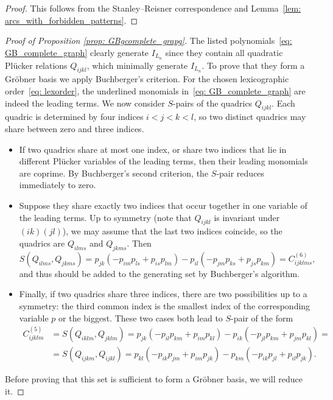 \documentclass[12pt,a4paper]{amsart}
\theoremstyle{definition}
\begin{document}
\begin{proof}
This follows from the Stanley–Reisner correspondence and Lemma~\ref{lem: arcs_with_forbidden_patterns}.
\end{proof}
\begin{proof}[Proof of Proposition \ref{prop: GBgcomplete_grapg}]
The listed polynomials~\eqref{eq: GB_complete_graph} clearly generate $I_{L_n}$ since they contain all quadratic Plücker relations $Q_{ijkl}$, which minimally generate $I_{L_n}$. To prove that they form a Gröbner basis we apply Buchberger’s criterion. 
For the chosen lexicographic order~\eqref{eq: lexorder}, the underlined monomials in~\eqref{eq: GB_complete_graph} are indeed the leading terms. We now consider $S$-pairs of the quadrics $Q_{ijkl}$. Each quadric is determined by four indices $i<j<k<l$, so two distinct quadrics may share between zero and three indices.
\begin{itemize}
    \item If two quadrics share at most one index, or share two indices that lie in different Plücker variables of the leading terms, then their leading monomials are coprime. By Buchberger’s second criterion, the $S$-pair reduces immediately to zero.
    \item Suppose they share exactly two indices that occur together in one variable of the leading terms. Up to symmetry (note that $Q_{ijkl}$ is invariant under $(ik)(jl)$), we may assume that the last two indices coincide, so the quadrics are $Q_{ilms}$ and $Q_{jkms}$. Then
\[
S(Q_{ilms}, Q_{jkms}) 
= p_{jk}(-p_{im}p_{ls} + p_{is}p_{lm}) - p_{il}(-p_{jm}p_{ks} + p_{js}p_{km})
= C^{(6)}_{ijklms},
\]
and thus should be added to the generating set by Buchberger's algorithm.
\item Finally, if two quadrics share three indices, there are two possibilities up to a symmetry: the third common index is the smallest index of the corresponding variable $p$ or the biggest. These two cases both lead to $S$-pair of the form
 \begin{align*}
     C^{(5)}_{ijklm} & =  S(Q_{iklm}, Q_{jklm}) = p_{jk}(-p_{il}p_{km} + p_{im}p_{kl}) - p_{ik}(-p_{jl}p_{km} + p_{jm}p_{kl}) = \\
  & =    S(Q_{ijkm}, Q_{ijkl}) = p_{kl}(-p_{ik}p_{jm} + p_{im}p_{jk}) - p_{km}(-p_{ik}p_{jl} + p_{il}p_{jk}).
 \end{align*}
\end{itemize}
Before proving that this set is sufficient to form a Gröbner basis, we will reduce it.


\end{proof}
\end{document}
